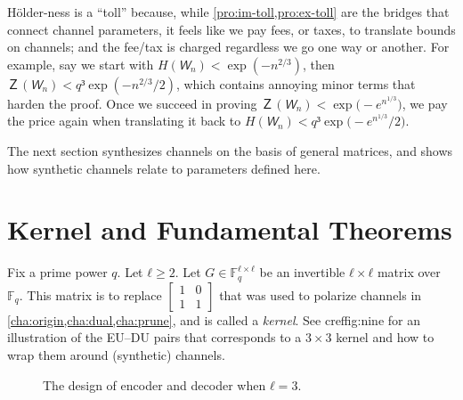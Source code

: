 \documentclass[openany]{amsbook}
\makeatletter
\numberwithin{equation}{chapter}
\numberwithin{figure}{chapter}
\numberwithin{table}{chapter}
\def\bigl@C#1{\bigl#1}					\def\bigr@C#1{\bigr#1}
\def\({\bigl@C(}	\def\){\bigr@C)}	令（{\Bigl(}			令）{\Bigr)}
\def\loll{\bsm{1&0\\1&1}}
\def\bsm#1{[\begin{smallmatrix}#1\end{smallmatrix}]}
\theoremstyle{definition}	理dfn:Definition~?s			理exa:Example~?s
\theoremstyle{remark}		理cla:Claim~?s				理rem:Remark~?s
\makeatother
\begin{document}
	Hölder-ness is a “toll” because, while \cref{pro:im-toll,pro:ex-toll}
	are the bridges that connect channel parameters,
	it feels like we pay fees, or taxes, to translate bounds on channels;
	and the fee/tax is charged regardless we go one way or another.
	For example, say we start with $H(𝘞_n)<\exp(-n^{2/3})$,
	then $Ｚ(𝘞_n)<q³\exp(-n^{2/3}/2)$,
	which contains annoying minor terms that harden the proof.
	Once we succeed in proving $Ｚ(𝘞_n)<\exp\(-e^{n^{1/3}}\)$, we pay the price again
	when translating it back to $H(𝘞_n)<q³\exp\(-e^{n^{1/3}}/2\)$.
	
	The next section synthesizes channels on the basis of general matrices,
	and shows how synthetic channels relate to parameters defined here.

\section{Kernel and Fundamental Theorems}\label{sec:matrix}

	Fix a prime power $q$.
	Let $ℓ≥2$.
	Let $G∈𝔽_q^{ℓ×ℓ}$ be an invertible $ℓ×ℓ$ matrix over $𝔽_q$.
	This matrix is to replace $\loll$ that was used to polarize channels
	in \cref{cha:origin,cha:dual,cha:prune}, and is called a \emph{kernel}.
	See cref{fig:nine} for an illustration of the EU--DU pairs that corresponds to
	a $3×3$ kernel and how to wrap them around (synthetic) channels.
	
	\begin{figure}
		\caption{
			The design of encoder and decoder when $ℓ=3$.
		}\label{fig:nine}
	\end{figure}
	
\end{document}

